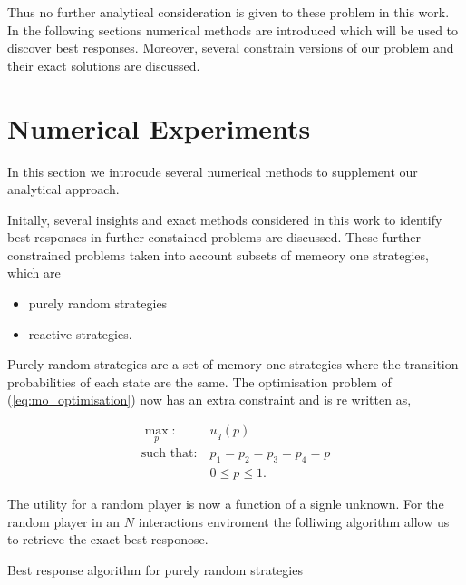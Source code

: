 \documentclass[10pt]{article}
\makeatletter
\def\BState{\State\hskip-\ALG@thistlm}
\makeatother
\begin{document}
Thus no further analytical consideration is given to these problem in this work.
In the following sections numerical methods are introduced which will be used to
discover best responses. Moreover, several constrain versions of our problem
and their exact solutions are discussed.

\section{Numerical Experiments}

In this section we introcude several numerical methods to supplement our analytical
approach.

Initally, several insights and exact methods considered in this work to identify
best responses in further constained problems are discussed. These further
constrained problems taken into account subsets of memeory one strategies, which
are

\begin{itemize}
    \item purely random strategies
    \item reactive strategies.
\end{itemize}

Purely random strategies are a set of memory one strategies where the transition
probabilities of each state are the same. The optimisation problem of (\ref{eq:mo_optimisation})
now has an extra constraint and is re written as,

\begin{equation}\label{eq:random_optimisation}
\begin{aligned}
\max_p: & \ u_q(p)
\\
\text{such that}: & \ p_1 = p_2 = p_3 = p_4 = p\\
    & \ 0 \leq p \leq 1. 
\end{aligned}
\end{equation}

The utility for a random player is now a function of a signle unknown. For the
random player in an \(N\) interactions enviroment the folliwing algorithm allow us to
retrieve the exact best responose.

\begin{algorithm}
    \caption{Best response algorithm for purely random strategies}\label{algo:purely}
    \end{algorithm}
\end{document}
